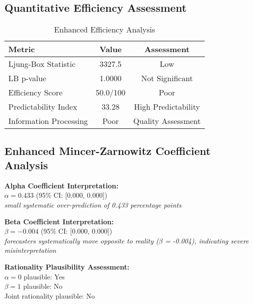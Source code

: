 \documentclass[11pt,a4paper]{article}
\begin{document}
\subsection{Quantitative Efficiency Assessment}
\begin{table}[H]
    \centering
    \caption{Enhanced Efficiency Analysis}
    \begin{tabular}{lcc}
        \toprule
        \textbf{Metric}        & \textbf{Value} & \textbf{Assessment} \\
        \midrule
        Ljung-Box Statistic    & 3327.5         & Low                 \\
        LB p-value             & 1.0000         & Not Significant     \\
        Efficiency Score       & 50.0/100       & Poor                \\
        Predictability Index   & 33.28          & High Predictability \\
        Information Processing & Poor           & Quality Assessment  \\
        \bottomrule
    \end{tabular}
\end{table}

\subsection{Enhanced Mincer-Zarnowitz Coefficient Analysis}
\textbf{Alpha Coefficient Interpretation:}\\
$\alpha = 0.433$ (95\% CI: [0.000, 0.000])\\
\textit{small systematic over-prediction of 0.433 percentage points}

\textbf{Beta Coefficient Interpretation:}\\
$\beta = -0.004$ (95\% CI: [0.000, 0.000])\\
\textit{forecasters systematically move opposite to reality ($\beta$ = -0.004), indicating severe misinterpretation}

\textbf{Rationality Plausibility Assessment:}\\
$\alpha = 0$ plausible: Yes\\
$\beta = 1$ plausible: No\\
Joint rationality plausible: No
\end{document}
